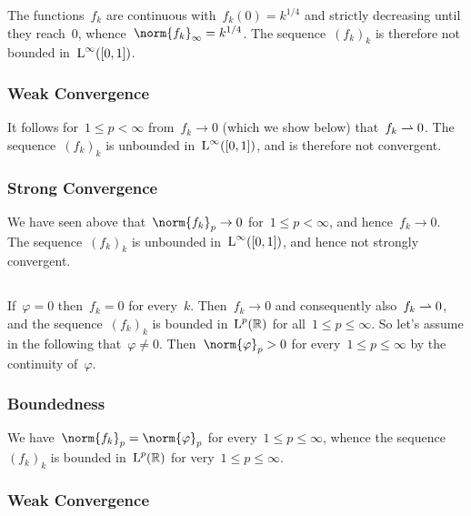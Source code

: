 The functions~$f_k$ are continuous with~$f_k(0) = k^{1/4}$ and strictly decreasing until they reach~$0$, whence~$\norm{f_k}_\infty = k^{1/4}$.
The sequence~$(f_k)_k$ is therefore not bounded in~$\operatorname{L}^\infty([0,1])$.



\subsubsection{Weak Convergence}

It follows for~$1 \leq p < \infty$ from~$f_k \to 0$ (which we show below) that~$f_k \rightharpoonup 0$.
The sequence~$(f_k)_k$ is unbounded in~$\operatorname{L}^\infty([0,1])$, and is therefore not {\weaklystar} convergent.



\subsubsection{Strong Convergence}

We have seen above that~$\norm{f_k}_p \to 0$ for~$1 \leq p < \infty$, and hence~$f_k \to 0$.
The sequence~$(f_k)_k$ is unbounded in~$\operatorname{L}^\infty([0,1])$, and hence not strongly convergent.





\subsection{}

If~$\varphi = 0$ then~$f_k = 0$ for every~$k$.
Then~$f_k \to 0$ and consequently also~$f_k \rightharpoonup 0$, and the sequence~$(f_k)_k$ is bounded in~$\operatorname{L}^p(\mathbb{R})$ for all~$1 \leq p \leq \infty$.
So let’s assume in the following that~$\varphi \neq 0$.
Then~$\norm{\varphi}_p > 0$ for every~$1 \leq p \leq \infty$ by the continuity of~$\varphi$.



\subsubsection{Boundedness}

We have~$\norm{f_k}_p =  \norm{\varphi}_p$ for every~$1 \leq p \leq \infty$, whence the sequence~$(f_k)_k$ is bounded in~$\operatorname{L}^p(\mathbb{R})$ for very~$1 \leq p \leq \infty$.



\subsubsection{Weak Convergence}

